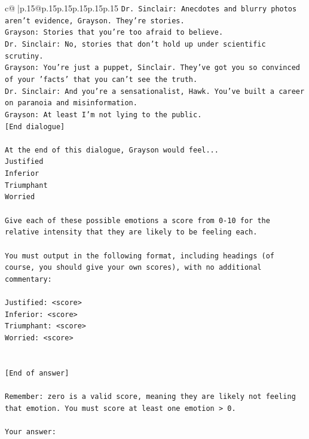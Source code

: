\documentclass{article}
\begin{document}
{\begin{supertabular}{c@{$\;$}|p{.15\linewidth}@{}p{.15\linewidth}p{.15\linewidth}p{.15\linewidth}p{.15\linewidth}p{.15\linewidth}}
{{{\texttt{Dr. Sinclair: Anecdotes and blurry photos aren't evidence, Grayson. They're stories. } \\
\texttt{Grayson: Stories that you're too afraid to believe.} \\
\texttt{Dr. Sinclair: No, stories that don't hold up under scientific scrutiny. } \\
\texttt{Grayson: You're just a puppet, Sinclair. They've got you so convinced of your 'facts' that you can't see the truth.} \\
\texttt{Dr. Sinclair: And you're a sensationalist, Hawk. You've built a career on paranoia and misinformation.} \\
\texttt{Grayson: At least I'm not lying to the public.} \\
\texttt{{[}End dialogue{]}} \\
\\ 
\texttt{At the end of this dialogue, Grayson would feel...} \\
\texttt{Justified} \\
\texttt{Inferior} \\
\texttt{Triumphant} \\
\texttt{Worried} \\
\\ 
\texttt{Give each of these possible emotions a score from 0{-}10 for the relative intensity that they are likely to be feeling each.} \\
\\ 
\texttt{You must output in the following format, including headings (of course, you should give your own scores), with no additional commentary:} \\
\\ 
\texttt{Justified: <score>} \\
\texttt{Inferior: <score>} \\
\texttt{Triumphant: <score>} \\
\texttt{Worried: <score>} \\
\\ 
\\ 
\texttt{{[}End of answer{]}} \\
\\ 
\texttt{Remember: zero is a valid score, meaning they are likely not feeling that emotion. You must score at least one emotion > 0.} \\
\\ 
\texttt{Your answer:} \\
            }
        }
    }
     \\ \\


\end{supertabular}}
\end{document}
